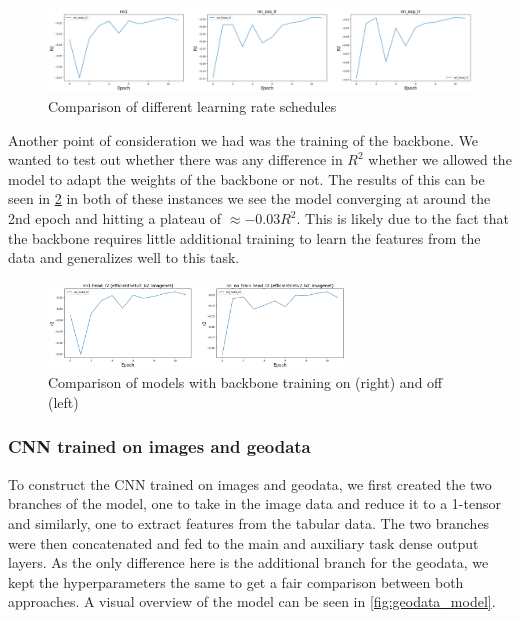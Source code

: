 \documentclass[12pt,a4paper,oneside]{article}
\begin{document}
\begin{figure}[!h]
    \centering
    \includegraphics[width=1\textwidth]{assets/lr_schedule_diffs.png}
    \caption{Comparison of different learning rate schedules}
    \label{fig:lr_schedules}
\end{figure}


Another point of consideration we had was the training of the backbone. We wanted to test out whether there was any difference in $R^2$ whether we allowed the model to adapt the weights of the backbone or not. The results of this can be seen in \ref{fig:backbone_training} in both of these instances we see the model converging at around the 2nd epoch and hitting a plateau of $\approx -0.03 R^2$. This is likely due to the fact that the backbone requires little additional training to learn the features from the data and generalizes well to this task.


\begin{figure}[!h]
    \centering
    \includegraphics[width=0.7\textwidth]{assets/train_vs_notrain.png}
    \caption{Comparison of models with backbone training on (right) and off (left)}
    \label{fig:backbone_training}
\end{figure}

\subsubsection{CNN trained on images and geodata}

To construct the CNN trained on images and geodata, we first created the two branches of the model, one to take in the image data and reduce it to a 1-tensor and similarly, one to extract features from the tabular data. The two branches were then concatenated and fed to the main and auxiliary task dense output layers. As the only difference here is the additional branch for the geodata, we kept the hyperparameters the same to get a fair comparison between both approaches. A visual overview of the model can be seen in \ref{fig:geodata_model}.
\end{document}
